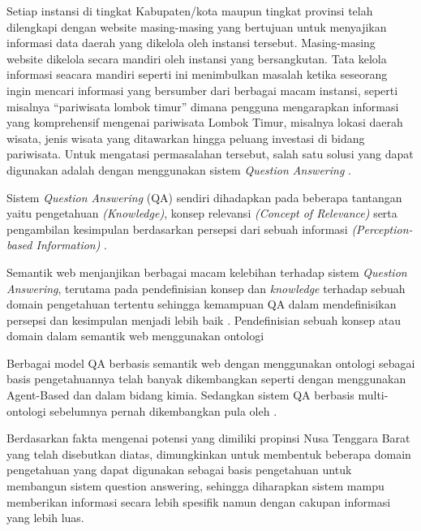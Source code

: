Setiap instansi di tingkat Kabupaten/kota maupun tingkat provinsi telah dilengkapi dengan website masing-masing yang bertujuan untuk menyajikan informasi data daerah yang dikelola oleh instansi tersebut. Masing-masing website dikelola secara mandiri oleh instansi yang bersangkutan. Tata kelola informasi seacara mandiri seperti ini menimbulkan masalah ketika seseorang ingin mencari informasi yang bersumber dari berbagai macam instansi, seperti misalnya ``pariwisata lombok timur'' dimana pengguna mengarapkan informasi yang komprehensif mengenai pariwisata Lombok Timur, misalnya lokasi daerah wisata, jenis wisata yang ditawarkan hingga peluang investasi di bidang pariwisata. Untuk mengatasi permasalahan tersebut, salah satu solusi yang dapat digunakan adalah dengan menggunakan sistem \textit{Question Answering} \citep{zadeh}.

Sistem \textit{Question Answering} (QA) sendiri dihadapkan pada beberapa tantangan yaitu pengetahuan \textit{(Knowledge)}, konsep relevansi \textit{(Concept of Relevance)} serta pengambilan kesimpulan berdasarkan persepsi dari sebuah informasi \textit{(Perception-based Information)} \citep{zadeh}.

Semantik web menjanjikan berbagai macam kelebihan terhadap sistem \textit{Question Answering}, terutama pada pendefinisian konsep dan \textit{knowledge} terhadap sebuah domain pengetahuan tertentu sehingga kemampuan QA dalam mendefinisikan persepsi dan kesimpulan menjadi lebih baik \citep*{guo_zhang}. Pendefinisian sebuah konsep atau domain dalam semantik web menggunakan ontologi

Berbagai model QA berbasis semantik web dengan menggunakan ontologi sebagai basis pengetahuannya telah banyak dikembangkan seperti \citet*{guo_zhang} dengan menggunakan Agent-Based dan \citet*{angele} dalam bidang kimia. Sedangkan sistem QA berbasis multi-ontologi sebelumnya pernah dikembangkan pula oleh \citet*{lopez}.

Berdasarkan fakta mengenai potensi yang dimiliki propinsi Nusa Tenggara Barat yang telah disebutkan diatas, dimungkinkan untuk membentuk beberapa domain pengetahuan yang dapat digunakan sebagai basis pengetahuan untuk membangun sistem question answering, sehingga diharapkan sistem mampu memberikan informasi secara lebih spesifik namun dengan cakupan informasi yang lebih luas.

